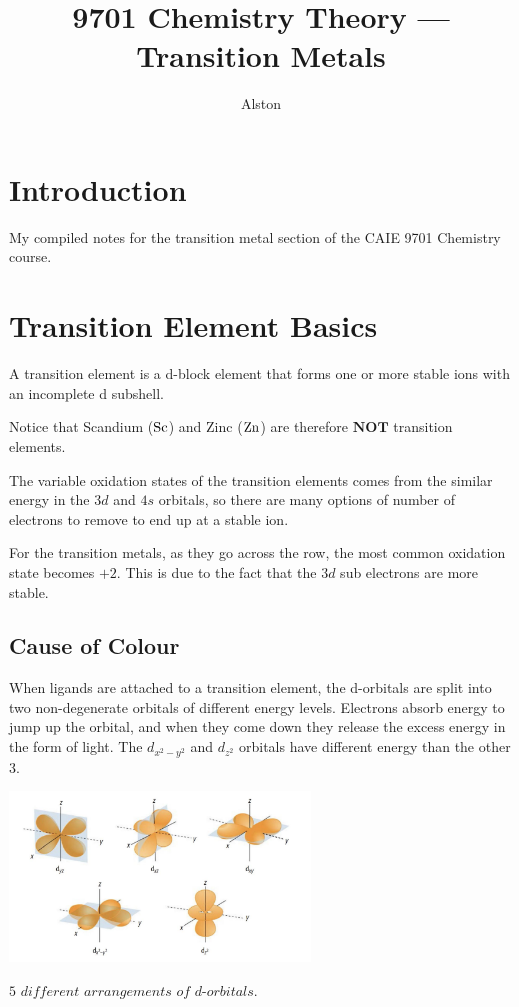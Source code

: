 \documentclass{article}
\title{9701 Chemistry Theory — Transition Metals}
\author{Alston}
\date{}
\theoremstyle{mytheoremstyle}
\theoremstyle{mytheoremstyle}
\theoremstyle{myproblemstyle}
\begin{document}
    \maketitle
    \section{Introduction}
    My compiled notes for the transition metal section of the CAIE 9701 Chemistry course.

    \section{Transition Element Basics}
    \begin{definition}
        A transition element is a d-block element that forms one or more stable ions with an incomplete d subshell.
    \end{definition}

    Notice that Scandium ($\ce{Sc}$) and Zinc ($\ce{Zn}$) are therefore $\textbf{NOT}$ transition elements.

    The variable oxidation states of the transition elements comes from the similar energy in the $3d$ and $4s$ orbitals, so there are many options of number of electrons to remove to end up at a stable ion.

    For the transition metals, as they go across the row, the most common oxidation state becomes $+2$. This is due to the fact that the $3d$ sub electrons are more stable. 

    \subsection{Cause of Colour}
    When ligands are attached to a transition element, the d-orbitals are split into two non-degenerate orbitals of different energy levels. Electrons absorb energy to jump up the orbital, and when they come down they release the excess energy in the form of light. The $d_{x^2 - y^2}$ and $d_{z^2}$ orbitals have different energy than the other 3.
    \begin{center}
        \includegraphics[width=0.6\textwidth]{image.png}
    \end{center}
    \begin{center}
        $\textit{5 different arrangements of d-orbitals.}$
    \end{center}
\end{document}
